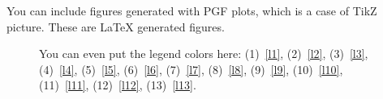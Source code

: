 You can include figures generated with PGF plots, which is a case of TikZ picture. These are LaTeX generated figures.

\begin{figure}
	\begin{minipage}{0.4\textwidth}
		\hspace{-2cm}
							
	\end{minipage}
	\hspace{4cm}
	\begin{minipage}{0.4\textwidth}
		\hspace{-2cm}
								
	\end{minipage}
	  \caption{You can even put the legend colors here: (1)~\ref{l1}, (2)~\ref{l2}, (3)~\ref{l3}, (4)~\ref{l4}, (5)~\ref{l5}, (6)~\ref{l6}, (7)~\ref{l7}, (8)~\ref{l8}, (9)~\ref{l9}, (10)~\ref{l10}, (11)~\ref{l11}, (12)~\ref{l12}, (13)~\ref{l13}.}
	  \label{fig:pgf_plots_figure}
\end{figure}	